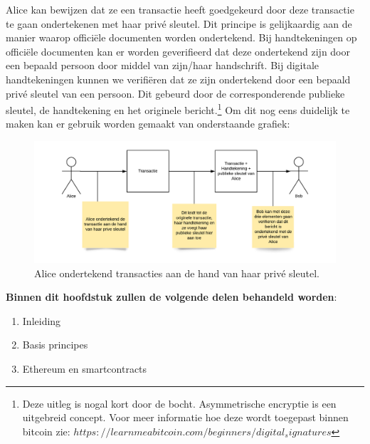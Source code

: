Alice kan bewijzen dat ze een transactie heeft goedgekeurd door deze transactie te gaan ondertekenen met haar privé sleutel. Dit principe is gelijkaardig aan de manier waarop officiële documenten worden ondertekend. Bij handtekeningen op officiële documenten kan er worden geverifieerd dat deze ondertekend zijn door een bepaald persoon door middel van zijn/haar handschrift. Bij digitale handtekeningen kunnen we verifiëren dat ze zijn ondertekend door een bepaald privé sleutel van een persoon. Dit gebeurd door de corresponderende publieke sleutel, de handtekening en het originele bericht.\footnote{Deze uitleg is nogal kort door de bocht. Asymmetrische encryptie is een uitgebreid concept. Voor meer informatie hoe deze wordt toegepast binnen bitcoin zie: $https://learnmeabitcoin.com/beginners/digital_signatures$} Om dit nog eens duidelijk te maken kan er gebruik worden gemaakt van onderstaande grafiek:

\begin{figure}[h!]
	\centering
		\includegraphics[scale=0.4]{blockchain-2.png}
	\caption[Blockchain - Voorstelling 2]{Alice ondertekend transacties aan de hand van haar privé sleutel.}
\end{figure}


\textbf{Binnen dit hoofdstuk zullen de volgende delen behandeld worden}:

\begin{enumerate}
\item Inleiding
\item Basis principes
\item Ethereum en smartcontracts
\end{enumerate}